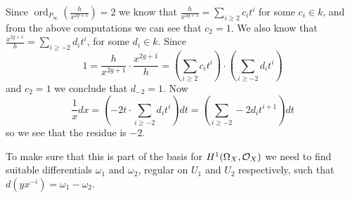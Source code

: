 \documentclass[draft, 11pt]{article} %
\theoremstyle{plain}
\theoremstyle{remark}
\newcommand{\cO}{{\cal O}}
\DeclareMathOperator{\ord}{ord}
\begin{document}
Since $\ord_{P_\infty}\left(\frac{h}{x^{2g+1}}\right) = 2$ we know that $\frac{h}{x^{2g+1}} = \sum_{i\geq 2} c_it^i$ for some $c_i\in k$, and from the above computations we can see that $c_2 = 1$.
We also know that $\frac{x^{2g+1}}{h} = \sum_{i\geq -2} d_it^i$, for some $d_i\in k$.
Since \[
1 = \frac{h}{x^{2g+1}} \cdot \frac{x^{2g+1}}{h} = \left( \sum_{i\geq 2} c_it^i\right) \cdot \left( \sum_{i\geq -2} d_it^i\right)
\]
 and $c_2 = 1$ we conclude that $d_{-2} = 1$. 
Now 
\[
\frac{1}{x}dx = \left( -2t \cdot \sum_{i\geq -2} d_it^i\right) dt = \left( \sum_{i\geq -2}-2d_it^{i+1} \right) dt
\]
so we see that the residue is $-2$.

To make sure that this is part of the basis for $H^1(\Omega_X,\cO_X)$ we need to find suitable differentials $\omega_1$ and $\omega_2$, regular on $U_1$ and $U_2$ respectively, such that $d(yx^{-i}) = \omega_1 - \omega_2$.
\end{document}
